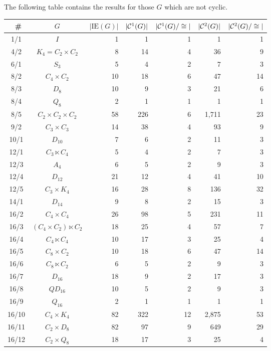 \documentclass[a4paper,11pt]{article}
\theoremstyle{plain}
\theoremstyle{definition}
\begin{document}
The following table contains the results for those $G$ which are not cyclic. 
\begin{longtable}{ccrrrrr}
	\hline 
	{\GAP\ }\# 
	    & $G$ 
	        & $|\mathrm{IE}(G)|$ 
	            & $|\mathcal{C}^1(G)|$ 
	                & $|\mathcal{C}^1(G)/\cong |$ 
	                    & $|\mathcal{C}^{2}(G)|$ 
	                        & $|\mathcal{C}^{2}(G)/\cong |$  \\ 
	\hline
	1/1 & $I$ & 1 & 1 & 1 & 1 & 1 \\ 
	4/2 & $K_4 = C_2 \times C_2$ & 8 & 14 & 4 & 36 & 9 \\ 
	6/1 & $S_3$ & 5 & 4 & 2 & 7 & 3 \\ 
	8/2 & $C_4 \times C_2$ & 10 & 18 & 6 & 47 & 14 \\ 
	8/3 & $D_8$ & 10 & 9 & 3 & 21 & 6 \\ 
	8/4 & $Q_8$ & 2 & 1 & 1 & 1 & 1 \\ 
	8/5 & $C_2 \times C_2 \times C_2$ & 58 & 226 & 6 & 1,711 & 23 \\ 
	9/2 & $C_3 \times C_3$ & 14 & 38 & 4 & 93 & 9 \\ 
	10/1 & $D_{10}$ & 7 & 6 & 2 & 11 & 3 \\ 
	12/1 & $C_3 \ltimes C_4$ & 5 & 4 & 2 & 7 & 3 \\ 
	12/3 & $A_4$ & 6 & 5 & 2 & 9 & 3 \\ 
	12/4 & $D_{12}$ & 21 & 12 & 4 & 41 & 10 \\ 
	12/5 & $C_3 \times K_4$ & 16 & 28 & 8 & 136 & 32 \\ 
	14/1 & $D_{14}$ & 9 & 8 & 2 & 15 & 3 \\ 
	16/2 & $C_4 \times C_4$ & 26 & 98 & 5 & 231 & 11 \\ 
	16/3 & $(C_4 \times C_2) \ltimes C_2$ & 18 & 25 & 4 & 57 & 7 \\ 
	16/4 & $C_4 \ltimes C_4$ & 10 & 17 & 3 & 25 & 4 \\ 
	16/5 & $C_8 \times C_2$ & 10 & 18 & 6 & 47 & 14 \\ 
	16/6 & $C_8 \ltimes C_2$ & 6 & 5 & 2 & 9 & 3 \\ 
	16/7 & $D_{16}$ & 18 & 9 & 2 & 17 & 3 \\ 
	16/8 & $QD_{16}$ & 10 & 5 & 2 & 9 & 3 \\ 
	16/9 & $Q_{16}$ & 2 & 1 & 1 & 1 & 1 \\ 
	16/10 & $C_4 \times K_4$ & 82 & 322 & 12 & 2,875 & 53 \\ 
	16/11 & $C_2 \times D_8$ & 82 & 97 & 9 & 649 & 29 \\ 
	16/12 & $C_2 \times Q_8$ & 18 & 17 & 3 & 25 & 4 \\ 

\end{longtable}
\end{document}
